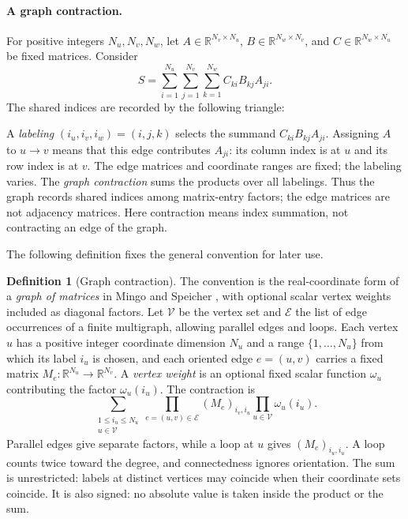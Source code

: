 \documentclass[11pt]{article}
\theoremstyle{definition}
\newtheorem{definition}{Definition}[section]
\theoremstyle{remark}
\theoremstyle{plain}
\newcommand{\R}{\mathbb R}
\begin{document}
\paragraph{A graph contraction.}
For positive integers $N_u,N_v,N_w$, let
$A\in\R^{N_v\times N_u}$, $B\in\R^{N_w\times N_v}$, and
$C\in\R^{N_w\times N_u}$ be fixed matrices. Consider
\[
 S=\sum_{i=1}^{N_u}\sum_{j=1}^{N_v}\sum_{k=1}^{N_w}
       C_{ki}B_{kj}A_{ji}.
\]
The shared indices are recorded by the following triangle:
\begin{center}
\end{center}
A \emph{labeling} $(i_u,i_v,i_w)=(i,j,k)$ selects the summand
$C_{ki}B_{kj}A_{ji}$. Assigning $A$ to $u\to v$ means that this
edge contributes $A_{ji}$: its column index is at $u$ and its row
index is at $v$. The edge matrices and coordinate ranges are fixed;
the labeling varies. The \emph{graph contraction} sums the products
over all labelings. Thus the graph records shared indices among
matrix-entry factors; the edge matrices are not adjacency matrices.
Here contraction means index summation, not contracting an edge
of the graph.

The following definition fixes the general convention for later use.

\begin{definition}[Graph contraction]\label{def:graph-contraction}
The convention is the real-coordinate form of a \emph{graph of matrices} in
Mingo and Speicher \cite[Definition~8 and Eq.~(9), pp.~2279--2280]{mingo},
with optional scalar vertex weights included as diagonal factors.
Let $\mathcal V$ be the vertex set
and $\mathcal E$ the list of edge occurrences of a finite multigraph,
allowing parallel edges and loops. Each vertex $u$ has a positive integer
coordinate dimension $N_u$ and a range $\{1,\ldots,N_u\}$ from which
its label $i_u$ is chosen,
and each oriented edge $e=(u,v)$ carries
a fixed matrix $M_e:\R^{N_u}\to\R^{N_v}$. A \emph{vertex weight}
is an optional fixed scalar function $\omega_u$ contributing the
factor $\omega_u(i_u)$. The contraction is
\begin{equation}\label{eq:graph-contraction}
 \sum_{\substack{1\le i_u\le N_u\\u\in\mathcal V}}
       \prod_{e=(u,v)\in\mathcal E}(M_e)_{i_v,i_u}
       \prod_{u\in\mathcal V}\omega_u(i_u).
\end{equation}
Parallel edges give separate factors, while a loop at $u$ gives
$(M_e)_{i_u,i_u}$. A loop counts twice toward the degree, and
connectedness ignores orientation. The sum is unrestricted:
labels at distinct vertices may coincide when their coordinate
sets coincide. It is also signed: no absolute value is taken inside
the product or the sum.
\end{definition}
\end{document}
